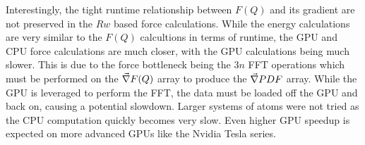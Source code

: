 Interestingly, the tight runtime relationship between $F(Q)$ and its gradient are not preserved in the $Rw$ based force calculations.
While the energy calculations are very similar to the $F(Q)$ calcultions in terms of runtime, the GPU and CPU force calculations are much closer, with the GPU calculations being much slower.
This is due to the force bottleneck being the $3n$ FFT operations which must be performed on the $\vec{\nabla} F(Q)$ array to produce the $\vec{\nabla} PDF$ array.
While the GPU is leveraged to perform the FFT, the data must be loaded off the GPU and back on, causing a potential slowdown.
Larger systems of atoms were not tried as the CPU computation quickly becomes very slow.
Even higher GPU  speedup is expected on more advanced GPUs like the Nvidia Tesla series.
